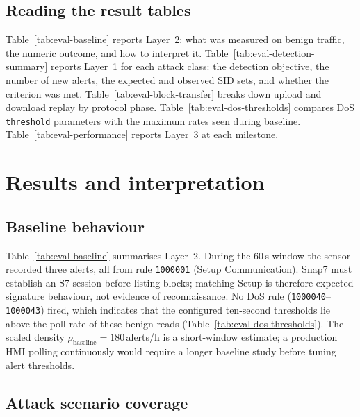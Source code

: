 \documentclass[../main.tex]{subfiles}
\begin{document}

\subsection{Reading the result tables}

Table~\ref{tab:eval-baseline} reports Layer~2: what was measured on benign traffic, the numeric outcome, and how to interpret it. Table~\ref{tab:eval-detection-summary} reports Layer~1 for each attack class: the detection objective, the number of new alerts, the expected and observed SID sets, and whether the criterion was met. Table~\ref{tab:eval-block-transfer} breaks down upload and download replay by protocol phase. Table~\ref{tab:eval-dos-thresholds} compares DoS \texttt{threshold} parameters with the maximum rates seen during baseline. Table~\ref{tab:eval-performance} reports Layer~3 at each milestone.

\section{Results and interpretation}
\label{sec:eval-results}

\subsection{Baseline behaviour}
\label{sec:eval-fp}

Table~\ref{tab:eval-baseline} summarises Layer~2. During the 60\,s window the sensor recorded three alerts, all from rule \texttt{1000001} (Setup Communication). Snap7 must establish an S7 session before listing blocks; matching Setup is therefore expected signature behaviour, not evidence of reconnaissance. No DoS rule (\texttt{1000040}--\texttt{1000043}) fired, which indicates that the configured ten-second thresholds lie above the poll rate of these benign reads (Table~\ref{tab:eval-dos-thresholds}). The scaled density $\rho_{\mathrm{baseline}} = 180$\,alerts/h is a short-window estimate; a production HMI polling continuously would require a longer baseline study before tuning alert thresholds.

\subsection{Attack scenario coverage}
\label{sec:eval-detection}
\end{document}
